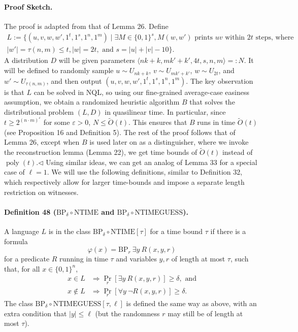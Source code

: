 \documentclass[10pt,a4paper]{article}
\begin{document}
\paragraph{Proof Sketch.} The proof is adapted from that of Lemma 26. Define
\begin{multline*}
L:=\{(u,v,w,w',1^t,1^s,1^n,1^m)\mid\exists M\in\{0,1\}^s,M(w,w')\text{ prints }uv\text{ within }2t\text{ steps, where}\\
|w'|=\tau(n,m)\leq t,|w|=2t,\text{ and }s=|u|+|v|-10\}.
\end{multline*}
A distribution $D$ will be given parameters $\langle nk+k,mk'+k',4t,s,n,m\rangle=:N$. It will be defined to randomly sample $u\sim U_{nk+k}$, $v\sim U_{mk'+k'}$, $w\sim U_{2t}$, and $w'\sim U_{\tau(n,m)}$, and then output $(u,v,w,w',1^t,1^s,1^n,1^m)$.
The key observation is that $L$ can be solved in NQL, so using our fine-grained average-case easiness assumption, we obtain a randomized heuristic algorithm $B$ that solves the distributional problem $(L,D)$ in quasilinear time. In particular, since $t\geq2^{(n\cdot m)^\varepsilon}$ for some $\varepsilon>0$, $N\leq\widetilde O(t)$. This ensures that $B$ runs in time $\widetilde O(t)$ (see Proposition 16 and Definition 5).
The rest of the proof follows that of Lemma 26, except when $B$ is used later on as a distinguisher, where we invoke the reconstruction lemma (Lemma 22), we get time bounds of $\widetilde O(t)$ instead of $\operatorname{poly}(t)$.\hfill$\triangleleft$
Using similar ideas, we can get an analog of Lemma 33 for a special case of $\ell=1$. We will use the following definitions, similar to Definition 32, which respectively allow for larger time-bounds and impose a separate length restriction on witnesses.
\paragraph{Definition 48 ($\mathrm{BP}_\delta\circ\mathrm{NTIME}$ and $\mathrm{BP}_\delta\circ\mathrm{NTIMEGUESS}$).} A language $L$ is in the class $\mathrm{BP}_\delta\circ\mathrm{NTIME}[\tau]$ for a time bound $\tau$ if there is a formula
\[\varphi(x)=\mathrm{BP}_r\ \exists y\ R(x,y,r)\]
for a predicate $R$ running in time $\tau$ and variables $y,r$ of length at most $\tau$, such that, for all $x\in\{0,1\}^n$,
\begin{align*}
x\in L&\Longrightarrow\Pr_r[\exists y\ R(x,y,r)]\geq\delta,\text{ and}\\
x\notin L&\Longrightarrow\Pr_r[\forall y\ \neg R(x,y,r)]\geq\delta.
\end{align*}
The class $\mathrm{BP}_\delta\circ\mathrm{NTIMEGUESS}[\tau,\ell]$ is defined the same way as above, with an extra condition that $|y|\leq\ell$ (but the randomness $r$ may still be of length at most $\tau$).
\end{document}
